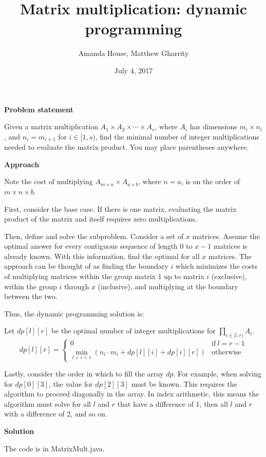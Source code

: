 \documentclass[12pt]{article}
\title{Matrix multiplication: dynamic programming}
\author{Amanda House, Matthew Gharrity}
\date{July 4, 2017}
\begin{document}
\maketitle

\textbf{Problem statement}

Given a matrix multiplication $A_1 \times A_2 \times \cdots \times A_s$,
where $A_i$ has dimensions $m_i \times n_i$,
and $n_i = m_{i +1}$
for $i \in [1, s)$,
find the minimal number of integer multiplications needed to evaluate the matrix product. You may place parentheses anywhere.

\textbf{Approach}

Note the cost of multiplying $A_{m \times n} \times A_{a \times b}$,
where $n = a$,
is on the order of $m \times n \times b$.

First, consider the base case. If there is one matrix, evaluating the matrix product of the matrix and itself requires zero multiplications.

Then, define and solve the subproblem. Consider a set of $x$ matrices. Assume the optimal answer for every contiguous sequence of length 0 to $x-1$ matrices is already known. With this information, find the optimal for all $x$ matrices. The approach can be thought of as finding the boundary $i$ which minimizes the costs of multiplying matrices within the group matrix 1 up to matrix $i$ (exclusive), within the group $i$ through $x$ (inclusive), and multiplying at the boundary between the two.

Thus, the dynamic programming solution is:

Let $dp[l][r]$ be the optimal number of integer multiplications for $\prod\limits_{i \in [l, r)} A_i$.
\[
  dp[l][r]=
    \begin{cases}
      0 & \text{if}\ l=r-1 \\
      \min\limits_{l < i < r} (n_l \cdot m_i + dp[l][i] + dp[i][r]) & \text{otherwise}
    \end{cases}
\]

Lastly, consider the order in which to fill the array $dp$. For example, when solving for $dp[0][3]$, the value for $dp[2][3]$ must be known. This requires the algorithm to proceed diagonally in the array. In index arithmetic, this means the algorithm must solve for all $l$ and $r$ that have a difference of 1, then all $l$ and $r$ with a difference of 2, and so on.

\textbf{Solution}

The code is in MatrixMult.java.
\end{document}
